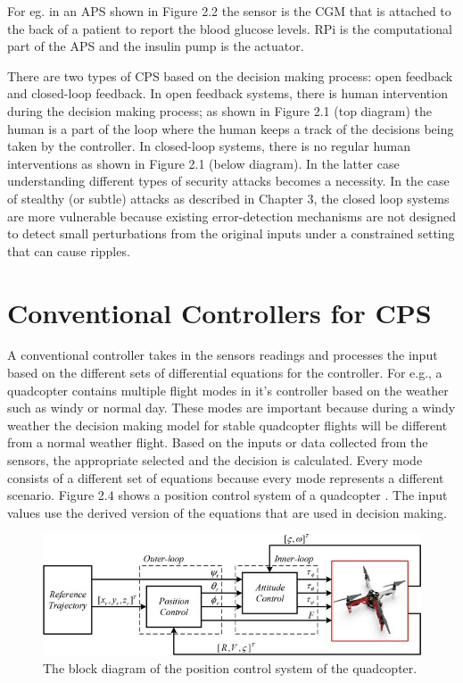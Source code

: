 For eg. in an \ac{APS} shown in Figure 2.2 the sensor is the \ac{CGM} that is attached to the back of a patient to report the blood glucose levels.  
\ac{RPi} is the computational part of the \ac{APS} and the insulin pump is the actuator. 

There are two types of CPS based on the decision making process: open feedback and closed-loop feedback.
In open feedback systems, there is human intervention during the decision making process; as shown in Figure 2.1 (top diagram) the human is a part of the loop where the human keeps a track of the decisions being taken by the controller. 
In closed-loop systems, there is no regular human interventions as shown in Figure 2.1 (below diagram). 
 In the latter case understanding different types of security attacks becomes a necessity. 
 In the case of stealthy (or subtle) attacks as described in Chapter 3, the closed loop systems are more vulnerable because existing error-detection mechanisms are not designed to detect small perturbations from the original inputs under a constrained setting that can cause ripples. 

\section{Conventional Controllers for CPS}

A conventional controller takes in the sensors readings and processes the input based on the different sets of differential equations for the controller. 
 For e.g., a quadcopter contains multiple flight modes in it's controller based on the weather such as windy or normal day. 
 These modes are important because during a windy weather the decision making model for stable quadcopter flights will be different from a normal weather flight. 
 Based on the inputs or data collected from the sensors, the appropriate selected and the decision is calculated. 
 Every mode consists of a different set of equations because every mode represents a different scenario.
  Figure 2.4 shows a position control system of a quadcopter \cite{inbook}. The input values use the derived version of the equations that are used in decision making. 

\begin{figure}
	\centering
	\includegraphics[width=0.7\linewidth]{Images/controltheory}
	\caption{The block diagram of the position control system of the quadcopter.
	}
	\label{fig:controltheory}
\end{figure}


